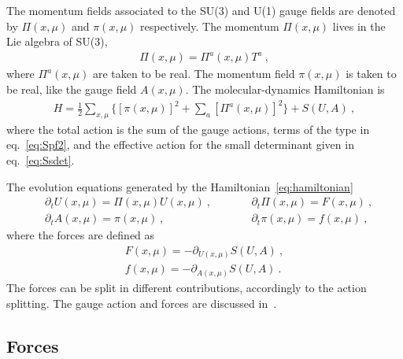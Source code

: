 \documentclass[11pt,fleqn]{article}
\begin{document}
The momentum fields associated to the SU(3) and U(1) gauge fields are denoted by $\Pi(x,\mu)$ and $\pi(x,\mu)$ respectively. The momentum $\Pi(x,\mu)$ lives in the Lie algebra of SU(3),
\begin{gather}
   \Pi(x,\mu) = \Pi^a(x,\mu) T^a \ ,
\end{gather}
where $\Pi^a(x,\mu)$ are taken to be real. The momentum field $\pi(x,\mu)$ is taken to be real, like the gauge field $A(x,\mu)$. The molecular-dynamics Hamiltonian is
\begin{gather}
   H = \frac{1}{2} \sum_{x,\mu} \bigg\{ [\pi(x,\mu)]^2 + \sum_a [\Pi^a(x,\mu)]^2 \bigg\} + S(U,A) \ ,
   \label{eq:hamiltonian}
\end{gather}
where the total action is the sum of the gauge actions, terms of the type in eq.~\eqref{eq:Spf2}, and the effective action for the small determinant given in eq.~\eqref{eq:Ssdet}.

The evolution equations generated by the Hamiltonian~\eqref{eq:hamiltonian}
\begin{subequations}
   \label{eq:MD}
   \begin{alignat}{2}
      &
      \partial_t U(x,\mu) = \Pi(x,\mu) U(x,\mu) \ ,
      &&
      \partial_t \Pi(x,\mu) = F(x,\mu) \ ,
      \\
      & 
      \partial_t A(x,\mu) = \pi(x,\mu) \ ,
      & \qquad &
      \partial_t \pi(x,\mu) = f(x,\mu) \ ,
   \end{alignat}
\end{subequations}
where the forces are defined as
\begin{subequations}
   \label{eq:force}
   \begin{gather}
      F(x,\mu) = - \partial_{U(x,\mu)} S(U,A) \ ,
      \label{eq:forceSU3} \\
      f(x,\mu) = - \partial_{A(x,\mu)} S(U,A) \ .
      \label{eq:forceU1}
   \end{gather}
\end{subequations}
The forces can be split in different contributions, accordingly to the action splitting. The gauge action and forces are discussed in~\cite{gauge_action,openQCD:gauge_action}.



\subsection{Forces}
\end{document}
